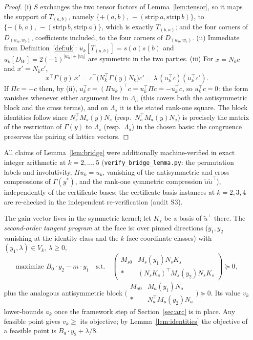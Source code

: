 \documentclass[11pt]{article}
\newcommand{\lam}{\lambda}
\begin{document}
\begin{proof}
(i) $S$ exchanges the two tensor factors of Lemma~\ref{lem:tensor}, so it
maps the support of $T_{(a,b)}$, namely
$\{+(a,b),\,-(\mathrm{strip}\,a,\mathrm{strip}\,b)\}$, to
$\{+(b,a),\,-(\mathrm{strip}\,b,\mathrm{strip}\,a)\}$, which is exactly
$T_{(b,a)}$; and the four corners of $D_{(w_a,w_b)}$, coefficients
included, to the four corners of $D_{(w_b,w_a)}$.
(ii) Immediate from Definition~\ref{def:uk}: $u_k[T_{(a,b)}]=s(a)s(b)$
and $u_k[D_W]=2(-1)^{|w_a|+|w_b|}$ are symmetric in the two parties.
(iii) For $x=N_kc$ and $x'=N_kc'$,
\[
x^\top\Gamma(y)\,x'
=c^\top\bigl(N_k^\top\Gamma(y)N_k\bigr)c'
=\lam\,(u_k^\top c)(u_k^\top c') .
\]
If $\Pi c=-c$ then, by (ii),
$u_k^\top c=(\Pi u_k)^\top c=u_k^\top\Pi c=-u_k^\top c$, so
$u_k^\top c=0$: the form vanishes whenever either argument lies in
$\Lambda_a$ (this covers both the antisymmetric block and the cross
terms), and on $\Lambda_s$ it is the stated rank-one square. The block
identities follow since $N_s^\top M_s(y)N_s$ (resp.\
$N_a^\top M_a(y)N_a$) is precisely the matrix of the restriction of
$\Gamma(y)$ to $\Lambda_s$ (resp.\ $\Lambda_a$) in the chosen basis: the
congruence preserves the pairing of lattice vectors.
\end{proof}

All claims of Lemma~\ref{lem:bridge} were additionally machine-verified in
exact integer arithmetic at $k=2,\dots,5$
(\texttt{verify\_bridge\_lemma.py}: the permutation labels and
involutivity, $\Pi u_k=u_k$, vanishing of the antisymmetric and cross
compressions of $\Gamma(y^\ast)$, and the rank-one symmetric compression
$\tilde u\tilde u^\top$), independently of the certificate bases; the
certificate-basis instances at $k=2,3,4$ are re-checked in the independent
re-verification (audit S3).

The gain vector lives in the symmetric kernel; let $K_s$ be a basis of
$\tilde u^\perp$ there. The \emph{second-order tangent program} at the
face is: over pinned directions ($y_1,y_2$ vanishing at the identity class
and the $k$ face-coordinate classes) with $(y_1,\lam)\in V_k$, $\lam\ge0$,
\begin{equation}\label{eq:tangent}
\text{maximize } B_0\cdot y_2-m\cdot y_1
\quad\text{s.t.}\quad
\begin{pmatrix}M_{s0}&M_s(y_1)N_sK_s\\ \ast&(N_sK_s)^\top
M_s(y_2)N_sK_s\end{pmatrix}\succeq0,
\end{equation}
plus the analogous antisymmetric block
$\bigl(\begin{smallmatrix}M_{a0}&M_a(y_1)N_a\\ \ast&N_a^\top
M_a(y_2)N_a\end{smallmatrix}\bigr)\succeq0$. Its value $v_k$ lower-bounds
$a_k$ once the framework step of Section~\ref{sec:arc} is in place. Any
feasible point gives $v_k\ge$ its objective; by
Lemma~\ref{lem:identities} the objective of a feasible point is
$B_0\cdot y_2+\lam/8$.
\end{document}

